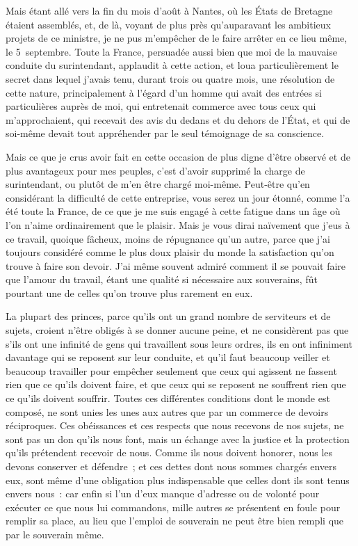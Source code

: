\documentclass[french,twoside]{book} %
\begin{document}
Mais étant allé vers la fin du mois d’août à Nantes, où les États de Bretagne étaient assemblés, et, de là, voyant de plus près qu’auparavant les ambitieux projets de ce ministre, je ne pus m’empêcher de le faire arrêter en ce lieu même, le 5 septembre. Toute la France, persuadée aussi bien que moi de la mauvaise conduite du surintendant, applaudit à cette action, et loua particulièrement le secret dans lequel j’avais tenu, durant trois ou quatre mois, une résolution de cette nature, principalement à l’égard d’un homme qui avait des entrées si particulières auprès de moi, qui entretenait commerce avec tous ceux qui m’approchaient, qui recevait des avis du dedans et du dehors de l’État, et qui de soi-même devait tout appréhender par le seul témoignage de sa conscience.\par
Mais ce que je crus avoir fait en cette occasion de plus digne d’être observé et de plus avantageux pour mes peuples, c’est d’avoir supprimé la charge de surintendant, ou plutôt de m’en être chargé moi-même. Peut-être qu’en considérant la difficulté de cette entreprise, vous serez un jour étonné, comme l’a été toute la France, de ce que je me suis engagé à cette fatigue dans un âge où l’on n’aime ordinairement que le plaisir. Mais je vous dirai naïvement que j’eus à ce travail, quoique fâcheux, moins de répugnance qu’un autre, parce que j’ai toujours considéré comme le plus doux plaisir du monde la satisfaction qu’on trouve à faire son devoir. J’ai même souvent admiré comment il se pouvait faire que l’amour du travail, étant une qualité si nécessaire aux souverains, fût pourtant une de celles qu’on trouve plus rarement en eux.\par
La plupart des princes, parce qu’ils ont un grand nombre de serviteurs et de sujets, croient n’être obligés à se donner aucune peine, et ne considèrent pas que s’ils ont une infinité de gens qui travaillent sous leurs ordres, ils en ont infiniment davantage qui se reposent sur leur conduite, et qu’il faut beaucoup veiller et beaucoup travailler pour empêcher seulement que ceux qui agissent ne fassent rien que ce qu’ils doivent faire, et que ceux qui se reposent ne souffrent rien que ce qu’ils doivent souffrir. Toutes ces différentes conditions dont le monde est composé, ne sont unies les unes aux autres que par un commerce de devoirs réciproques. Ces obéissances et ces respects que nous recevons de nos sujets, ne sont pas un don qu’ils nous font, mais un échange avec la justice et la protection qu’ils prétendent recevoir de nous. Comme ils nous doivent honorer, nous les devons conserver et défendre ; et ces dettes dont nous sommes chargés envers eux, sont même d’une obligation plus indispensable que celles dont ils sont tenus envers nous : car enfin si l’un d’eux manque d’adresse ou de volonté pour exécuter ce que nous lui commandons, mille autres se présentent en foule pour remplir sa place, au lieu que l’emploi de souverain ne peut être bien rempli que par le souverain même.\par
\end{document}
